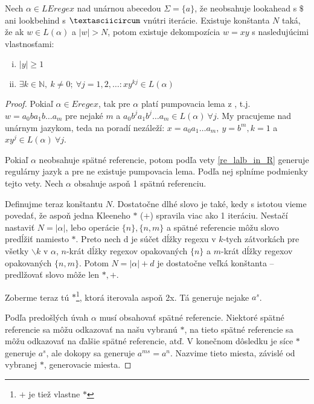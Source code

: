\documentclass{svk_long_sk}
\def\N{\mathds{N}} %
\def\le{LEregex}
\begin{document}
\begin{theorem}
Nech $\alpha\in\le$ nad unárnou abecedou $\Sigma = \lbrace a \rbrace$, že neobsahuje lookahead s $\mathdollar$ ani lookbehind s $\textasciicircum$ vnútri iterácie. Existuje konštanta $N$ taká, že ak $w \in L(\alpha)$ a $\vert w \vert > N$, potom existuje dekompozícia $w=xy$ s nasledujúcimi vlastnosťami:
\begin{enumerate}[(i)]
\item $\vert y \vert \geq 1$
\item $\exists k \in \N,~k\neq 0;~\forall j = 1,2,\ldots: xy^{kj} \in L(\alpha)$
\end{enumerate}
\end{theorem}
\begin{proof}
Pokiaľ $\alpha \in Eregex$, tak pre $\alpha$ platí pumpovacia lema z \cite[Lemma 1]{ExtendedRegexPower}, t.j. $w = a_0ba_1b\dots a_m$ pre nejaké $m$ a $a_0b^ja_1b^j\dots a_m \in L(\alpha)~\forall j$. My pracujeme nad unárnym jazykom, teda na poradí nezáleží: $x=a_0a_1\dots a_m,~y=b^m, k=1$ a $xy^j \in L(\alpha)~\forall j$.

Pokiaľ $\alpha$ neobsahuje spätné referencie, potom podľa vety \ref{re_lalb_in_R} generuje regulárny jazyk a pre ne existuje pumpovacia lema. Podľa nej splníme podmienky tejto vety. Nech $\alpha$ obsahuje aspoň 1 spätnú referenciu.

Definujme teraz konštantu $N$. Dostatočne dlhé slovo je také, kedy s istotou vieme povedať, že aspoň jedna Kleeneho $*$ ($+$) spravila viac ako 1 iteráciu. Nestačí nastaviť $N=|\alpha|$, lebo operácie $\lbrace n \rbrace,\lbrace n,m\rbrace$ a spätné referencie môžu slovo predĺžiť namiesto $*$. Preto nech d je súčet dĺžky regexu v $k$-tych zátvorkách pre všetky $\backslash k$ v $\alpha$,  $n$-krát dĺžky regexov opakovaných $\lbrace n\rbrace$ a $m$-krát dĺžky regexov opakovaných $\lbrace n,m \rbrace$. Potom $N=|\alpha|+d$ je dostatočne veľká konštanta -- predlžovať slovo môže len $*,+$.

Zoberme teraz tú $*$\footnote{$+$ je tiež vlastne $*$}, ktorá iterovala aspoň 2x. Tá generuje nejake $a^s$.

Podľa predošlých úvah $\alpha$ musí obsahovať spätné referencie. Niektoré spätné referencie sa môžu odkazovať na našu vybranú $*$, na tieto spätné referencie sa môžu odkazovať na ďalšie spätné referencie, atď. V konečnom dôsledku je síce $*$ generuje $a^s$, ale dokopy sa generuje $a^{ms} = a^n$. Nazvime tieto miesta, závislé od vybranej $*$, generovacie miesta.


\end{proof}
\end{document}
